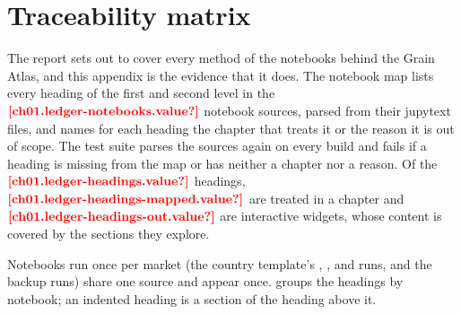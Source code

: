 \chapter{Traceability matrix}\label{app:traceability}

The report sets out to cover every method of the notebooks behind the Grain Atlas, and this appendix is the evidence
that it does. The notebook map lists every heading of the first and second level in the $\est{ch01.ledger-notebooks}{value}$
notebook sources, parsed from their jupytext files, and names for each heading the chapter that treats it or the reason
it is out of scope. The test suite parses the sources again on every build and fails if a heading is missing from the
map or has neither a chapter nor a reason. Of the $\est{ch01.ledger-headings}{value}$ headings,
$\est{ch01.ledger-headings-mapped}{value}$ are treated in a chapter and $\est{ch01.ledger-headings-out}{value}$ are
interactive widgets, whose content is covered by the sections they explore.

Notebooks run once per market (the country template's , ,
 and  runs, and the backup runs) share one source and appear once.
 groups the headings by notebook; an indented heading is a section of the heading above it.



